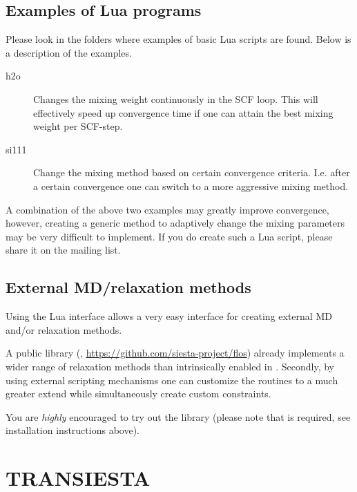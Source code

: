 \subsection{Examples of Lua programs}

Please look in the  folders where examples of
basic Lua scripts are found. Below is a description of the \program{*}
examples.


\begin{description}
  \item[h2o] Changes the mixing weight continuously in
  the SCF loop. This will effectively speed up convergence time if one
  can attain the best mixing weight per SCF-step.

  \item[si111] Change the mixing method based on certain convergence
  criteria. I.e. after a certain convergence one can switch to a more
  aggressive mixing method.
  
\end{description}

A combination of the above two examples may greatly improve
convergence, however, creating a generic method to adaptively change
the mixing parameters may be very difficult to implement. If you do
create such a Lua script, please share it on the mailing list.


\subsection{External MD/relaxation methods}

Using the Lua interface allows a very easy interface for creating
external MD and/or relaxation methods.

A public library (,
\url{https://github.com/siesta-project/flos}) already implements a
wider range of relaxation methods than intrinsically enabled in
\siesta. Secondly, by using external scripting mechanisms one can
customize the routines to a much greater extend while simultaneously
create custom constraints.

You are \emph{highly} encouraged to try out the  library
(please note that  is required, see installation
instructions above).



\section{TRANSIESTA}
\label{sec:transiesta}


